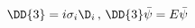\begin{equation}
\label{Dirac-3}
\DD{3} = i \sigma_i \D_i \, , \, \DD{3} \bar \psi = E \bar \psi
\end{equation}


